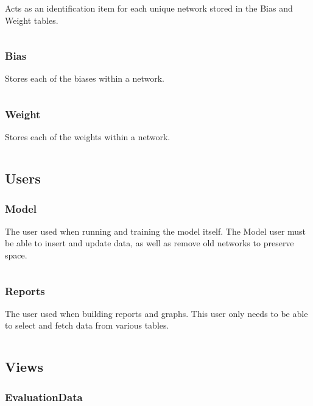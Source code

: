 \documentclass[12pt]{article}
\begin{document}
Acts as an identification item for each unique network stored in the Bias and Weight tables.

\inputminted{SQL}{../../sql/tables/network.sql}

\subsubsection{Bias}

Stores each of the biases within a network.

\inputminted{SQL}{../../sql/tables/bias.sql}

\subsubsection{Weight}

Stores each of the weights within a network.

\inputminted{SQL}{../../sql/tables/weight.sql}

\subsection{Users}

\subsubsection{Model}

The user used when running and training the model itself. The Model user must be able to insert and update data, as well as remove old networks to preserve space.

\inputminted{SQL}{../../sql/users/model.sql}

\subsubsection{Reports}

The user used when building reports and graphs. This user only needs to be able to select and fetch data from various tables.

\inputminted{SQL}{../../sql/users/reports.sql}

\subsection{Views}

\subsubsection{EvaluationData}
\end{document}
